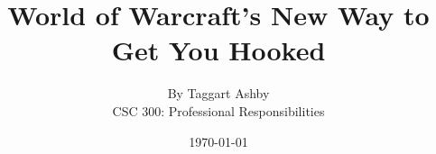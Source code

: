 \documentclass[11pt]{article}
\begin{document}

\title{\vfill World of Warcraft's New Way to Get You Hooked} %
\author{
By Taggart Ashby \vspace{10pt} \\
CSC 300: Professional Responsibilities  \vspace{10pt} \\
}
\date{\today} %

\maketitle

\vfill  %
\thispagestyle{empty} %
\newpage

\end{document}
